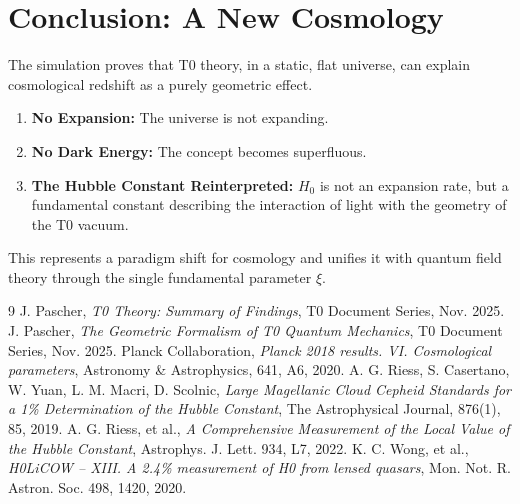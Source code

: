 	\section{Conclusion: A New Cosmology}
	The simulation proves that T0 theory, in a static, flat universe, can explain cosmological redshift as a purely geometric effect.
	\begin{enumerate}
		\item \textbf{No Expansion:} The universe is not expanding.
		\item \textbf{No Dark Energy:} The concept becomes superfluous.
		\item \textbf{The Hubble Constant Reinterpreted:} $H_0$ is not an expansion rate, but a fundamental constant describing the interaction of light with the geometry of the T0 vacuum.
	\end{enumerate}
	This represents a paradigm shift for cosmology and unifies it with quantum field theory through the single fundamental parameter $\xi$.
	\begin{thebibliography}{9}
		J. Pascher, \textit{T0 Theory: Summary of Findings}, T0 Document Series, Nov. 2025.
		J. Pascher, \textit{The Geometric Formalism of T0 Quantum Mechanics}, T0 Document Series, Nov. 2025.
		Planck Collaboration, \textit{Planck 2018 results. VI. Cosmological parameters}, Astronomy \& Astrophysics, 641, A6, 2020.
		A. G. Riess, S. Casertano, W. Yuan, L. M. Macri, D. Scolnic, \textit{Large Magellanic Cloud Cepheid Standards for a 1\% Determination of the Hubble Constant}, The Astrophysical Journal, 876(1), 85, 2019.
		A. G. Riess, et al., \textit{A Comprehensive Measurement of the Local Value of the Hubble Constant}, Astrophys. J. Lett. 934, L7, 2022.
		K. C. Wong, et al., \textit{H0LiCOW -- XIII. A 2.4\% measurement of H0 from lensed quasars}, Mon. Not. R. Astron. Soc. 498, 1420, 2020.
	\end{thebibliography}
